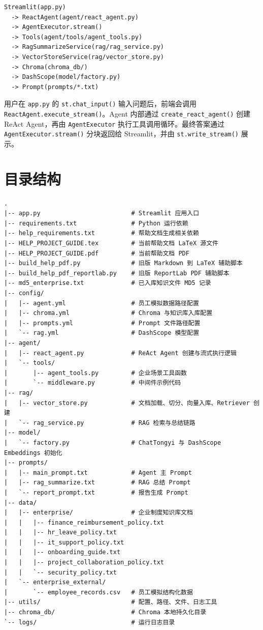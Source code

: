 \documentclass[UTF8,zihao=-4]{ctexart}
\begin{document}
\begin{Verbatim}[breaklines=true,breakanywhere=true,fontsize=\small]
Streamlit(app.py)
  -> ReactAgent(agent/react_agent.py)
  -> AgentExecutor.stream()
  -> Tools(agent/tools/agent_tools.py)
  -> RagSummarizeService(rag/rag_service.py)
  -> VectorStoreService(rag/vector_store.py)
  -> Chroma(chroma_db/)
  -> DashScope(model/factory.py)
  -> Prompt(prompts/*.txt)
\end{Verbatim}

用户在 \texttt{app.py} 的 \texttt{st.chat\_input()} 输入问题后，前端会调用 \texttt{ReactAgent.execute\_stream()}。Agent 内部通过 \texttt{create\_react\_agent()} 创建 ReAct Agent，再由 \texttt{AgentExecutor} 执行工具调用循环。最终答案通过 \texttt{AgentExecutor.stream()} 分块返回给 Streamlit，并由 \texttt{st.write\_stream()} 展示。

\section{目录结构}

\begin{Verbatim}[breaklines=true,breakanywhere=true,fontsize=\small]
.
|-- app.py                         # Streamlit 应用入口
|-- requirements.txt               # Python 运行依赖
|-- help_requirements.txt          # 帮助文档生成相关依赖
|-- HELP_PROJECT_GUIDE.tex         # 当前帮助文档 LaTeX 源文件
|-- HELP_PROJECT_GUIDE.pdf         # 当前帮助文档 PDF
|-- build_help_pdf.py              # 旧版 Markdown 到 LaTeX 辅助脚本
|-- build_help_pdf_reportlab.py    # 旧版 ReportLab PDF 辅助脚本
|-- md5_enterprise.txt             # 已入库知识文件 MD5 记录
|-- config/
|   |-- agent.yml                  # 员工模拟数据路径配置
|   |-- chroma.yml                 # Chroma 与知识库入库配置
|   |-- prompts.yml                # Prompt 文件路径配置
|   `-- rag.yml                    # DashScope 模型配置
|-- agent/
|   |-- react_agent.py             # ReAct Agent 创建与流式执行逻辑
|   `-- tools/
|       |-- agent_tools.py         # 企业场景工具函数
|       `-- middleware.py          # 中间件示例代码
|-- rag/
|   |-- vector_store.py            # 文档加载、切分、向量入库、Retriever 创建
|   `-- rag_service.py             # RAG 检索与总结链路
|-- model/
|   `-- factory.py                 # ChatTongyi 与 DashScope Embeddings 初始化
|-- prompts/
|   |-- main_prompt.txt            # Agent 主 Prompt
|   |-- rag_summarize.txt          # RAG 总结 Prompt
|   `-- report_prompt.txt          # 报告生成 Prompt
|-- data/
|   |-- enterprise/                # 企业制度知识库文档
|   |   |-- finance_reimbursement_policy.txt
|   |   |-- hr_leave_policy.txt
|   |   |-- it_support_policy.txt
|   |   |-- onboarding_guide.txt
|   |   |-- project_collaboration_policy.txt
|   |   `-- security_policy.txt
|   `-- enterprise_external/
|       `-- employee_records.csv   # 员工模拟结构化数据
|-- utils/                         # 配置、路径、文件、日志工具
|-- chroma_db/                     # Chroma 本地持久化目录
`-- logs/                          # 运行日志目录
\end{Verbatim}
\end{document}

